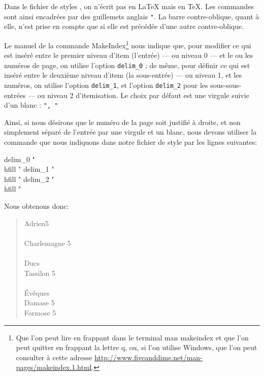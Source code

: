 \begin{attention}
Dans le fichier de styles , on n'écrit pas en \LaTeX{} mais en \TeX . Les commandes sont ainsi encadrées par des guillemets anglais \verb|"|. La barre contre-oblique, quant à elle, n'est prise en compte que si elle est précédée d'une autre contre-oblique.
\end{attention}

Le manuel de la commande MakeIndex\footnote{Que l'on peut lire en frappant dans le terminal {\ttfamily man makeindex} et que l'on peut quitter en frappant la lettre  {\ttfamily q}, ou, si l'on utilise Windows, que l'on peut consulter à cette adresse \url{http://www.fiveanddime.net/man-pages/makeindex.1.html}.} nous indique que, pour modifier ce qui est inséré entre le premier niveau d'item (l'entrée) --- ou niveau 0 --- et le ou les numéros de page, on utilise l'option \verb|delim_0| ; de même, pour définir ce qui est inséré entre le deuxième niveau d'item (la sous-entrée) --- ou niveau 1, et les numéros, on utilise l'option \verb+delim_1+, et l'option \verb|delim_2| pour les sous-sous-entrées --- ou niveau 2 d'itemisation. Le choix par défaut est une virgule suivie d'un blanc : \verb|", "|

Ainsi, si nous désirons que le numéro de la page soit justifié à droite, et non simplement séparé de l'entrée par une virgule et un blanc, nous devons utiliser la commande  que nous indiquons dans notre fichier de style par les lignes suivantes:

\begin{latexcode}
delim_0 "\\hfill "
delim_1 "\\hfill "
delim_2 "\\hfill "
\end{latexcode}

Nous obtenons donc: 

\begin{quotation}

\noindent Adrien\hfill 5 \\
\\
Charlemagne \hfill 5 \\
\\
Ducs \\
\hspace*{1em} Tassilon \hfill 5\\
\\
Évêques \\
\hspace*{1em} Damase \hfill 5\\
\hspace*{1em} Formose \hfill  5
\end{quotation}

